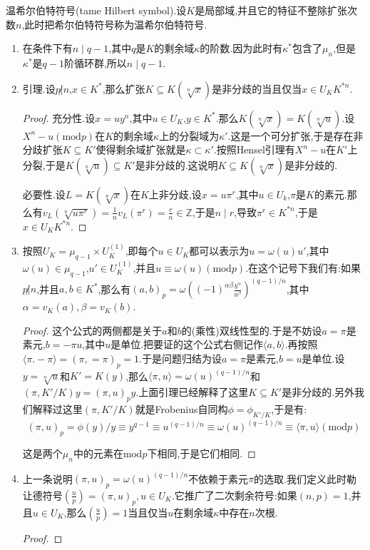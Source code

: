 温希尔伯特符号(tame Hilbert symbol).设$K$是局部域,并且它的特征不整除扩张次数$n$,此时把希尔伯特符号称为温希尔伯特符号.
\begin{enumerate}
	\item 在条件下有$n\mid q-1$,其中$q$是$K$的剩余域$\kappa$的阶数.因为此时有$\kappa^*$包含了$\mu_n$,但是$\kappa^*$是$q-1$阶循环群,所以$n\mid q-1$.
	\item 引理.设$p\not| n$,$x\in K^*$,那么扩张$K\subseteq K(\sqrt[n]{x})$是非分歧的当且仅当$x\in U_KK^{*n}$.
	\begin{proof}
		
		充分性.设$x=uy^n$,其中$u\in U_K$,$y\in K^*$.那么$K(\sqrt[n]{x})=K(\sqrt[n]{u})$.设$X^n-u(\mathrm{mod}p)$在$K$的剩余域$\kappa$上的分裂域为$\kappa'$.这是一个可分扩张,于是存在非分歧扩张$K\subseteq K'$使得剩余域扩张就是$\kappa\subset\kappa'$.按照Hensel引理有$X^n-u$在$K'$上分裂,于是$K(\sqrt[n]{u})\subseteq K'$是非分歧的.这说明$K\subseteq K(\sqrt[n]{x})$是非分歧的.
		
		必要性.设$L=K(\sqrt[n]{x})$在$K$上非分歧,设$x=u\pi^r$,其中$u\in U_k$,$\pi$是$K$的素元.那么有$v_L(\sqrt[n]{u\pi^r})=\frac{1}{n}v_L(\pi^r)=\frac{r}{n}\in\mathbb{Z}$,于是$n\mid r$,导致$\pi^r\in K^{*n}$,于是$x\in U_KK^{*n}$.
	\end{proof}
    \item 按照$U_K=\mu_{q-1}\times U_K^{(1)}$,即每个$u\in U_K$都可以表示为$u=\omega(u)u'$,其中$\omega(u)\in\mu_{q-1}$,$u'\in U_K^{(1)}$,并且$u\equiv\omega(u)(\mathrm{mod}p)$.在这个记号下我们有:如果$p\not| n$,并且$a,b\in K^*$,那么有$(a,b)_p=\omega\left((-1)^{\alpha\beta}\frac{b^{\alpha}}{a^{\beta}}\right)^{(q-1)/n}$,其中$\alpha=v_K(a),\beta=v_K(b)$.
    \begin{proof}
    	
    	这个公式的两侧都是关于$a$和$b$的(乘性)双线性型的.于是不妨设$a=\pi$是素元,$b=-\pi u$,其中$u$是单位.把要证的这个公式右侧记作$\langle a,b\rangle$.再按照$\langle\pi.-\pi\rangle=(\pi,=\pi)_p=1$.于是问题归结为设$a=\pi$是素元,$b=u$是单位.设$y=\sqrt[n]{u}$和$K'=K(y)$,那么$\langle\pi,u\rangle=\omega(u)^{(q-1)/n}$和$(\pi,K'/K)y=(\pi,u)_py$.上面引理已经解释了这里$K\subseteq K'$是非分歧的.另外我们解释过这里$(\pi,K'/K)$就是Frobenius自同构$\phi=\phi_{K'/K}$,于是有:
    	$$(\pi,u)_p=\phi(y)/y\equiv y^{q-1}\equiv u^{(q-1)/n}\equiv\omega(u)^{(q-1)/n}\equiv\langle\pi,u\rangle(\mathrm{mod}p)$$
    	
    	这是两个$\mu_n$中的元素在$\mathrm{mod}p$下相同,于是它们相同.
    \end{proof}
    \item 上一条说明$(\pi,u)_p=\omega(u)^{(q-1)/n}$不依赖于素元$\pi$的选取.我们定义此时勒让德符号$\left(\frac{u}{p}\right)=(\pi,u)_p,u\in U_K$.它推广了二次剩余符号:如果$(n,p)=1$,并且$u\in U_K$,那么$\left(\frac{u}{p}\right)=1$当且仅当$u$在剩余域$\kappa$中存在$n$次根.
    \begin{proof}
    	

\end{proof}
\end{enumerate}
